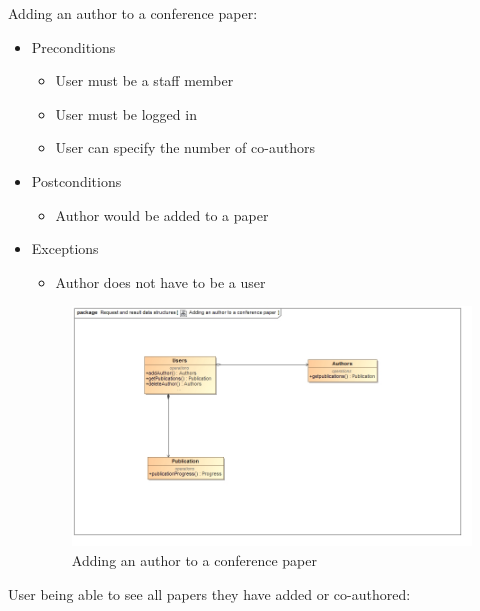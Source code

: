 \documentclass[a4paper,12pt]{article}
\begin{document}
\newpage
Adding an author to a conference paper:
\begin{itemize}
    \item Preconditions
    \begin{itemize}
        \item User must be a staff member
        \item User must be logged in
        \item User can specify the number of co-authors
    \end{itemize}
    \item Postconditions
    \begin{itemize}
        \item Author would be added to a paper
    \end{itemize}
    \item Exceptions
    \begin{itemize}
        \item Author does not have to be a user
    \end{itemize}
    
    \begin{figure}[H]
    \centering
    \caption{Adding an author to a conference paper}
    \includegraphics[width=1\textwidth]{use-case/adding-an-author-to-a-conference-paper.png}
    \end{figure}
\end{itemize}
User being able to see all papers they have added or co-authored:
\end{document}
